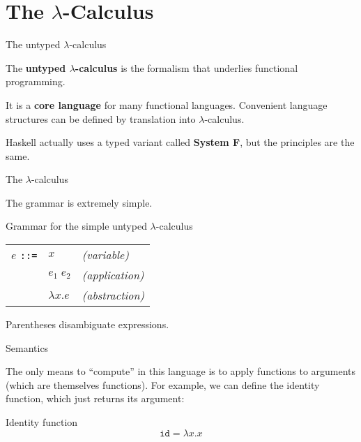 
\section{The $\lambda$-Calculus}

%
\begin{frame}{The untyped $\lambda$-calculus}

The \textbf{untyped $\lambda$-calculus} is the formalism that underlies
functional programming.

It is a \textbf{core language} for many functional languages. Convenient
language structures can be defined by translation into $\lambda$-calculus.

Haskell actually uses a typed variant called \textbf{System F}, but the
principles are the same.

\end{frame}

%
\begin{frame}{The $\lambda$-calculus}

The grammar is extremely simple.

\begin{block}{Grammar for the simple untyped $\lambda$-calculus}
\begin{tabular}{lll}
  $e$ \texttt{::=} & $x$              & \emph{(variable)} \\
                   & $e_1 \; e_2$     & \emph{(application)} \\
                   & $\lambda x . e$  & \emph{(abstraction)} \\
\end{tabular}
\end{block}

Parentheses disambiguate expressions.

\end{frame}

%
\begin{frame}{Semantics}

The only means to ``compute'' in this language is to apply functions to
arguments (which are themselves functions). For example, we can define the
identity function, which just returns its argument:

\begin{block}{Identity function}
\[
\mathtt{id} = \lambda x . x
\]
\end{block}

\end{frame}

